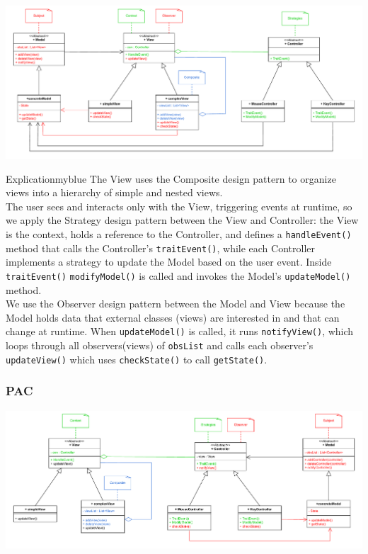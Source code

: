 \vspace{0.25cm}
\begin{center}
\includegraphics[height=0.25\textheight]{Chapters/MVC_PAC/mvc2.drawio.pdf}
\end{center}

\vspace{0.25cm}


\begin{prettyBox}{Explication}{myblue}
The View uses the Composite design pattern to organize views into a hierarchy of simple and nested views.\\[0.15cm]
The user sees and interacts only with the View, triggering events at runtime, so we apply the Strategy design
pattern between the View and Controller: the View is the context, holds a reference to the Controller, and defines
a \texttt{handleEvent()} method that calls the Controller’s \texttt{traitEvent()}, while each Controller implements
a strategy to update the Model based on the user event. Inside \texttt{traitEvent()} \texttt{modifyModel()} is called and invokes
the Model’s \texttt{updateModel()} method.\\[0.15cm]
We use the Observer design pattern between the Model and View because the Model holds data that external classes
(views) are interested in and that can change at runtime. When \texttt{updateModel()} is called, it runs \texttt{notifyView()},
which loops through all observers(views) of \texttt{obsList} and calls each observer’s \texttt{updateView()} which uses \texttt{checkState()} to call \texttt{getState()}.
\end{prettyBox}

\newpage
\subsubsection{PAC}

\vspace{0.25cm}
\begin{center}
\includegraphics[height=0.25\textheight]{Chapters/MVC_PAC/pac2.drawio.pdf}
\end{center}

